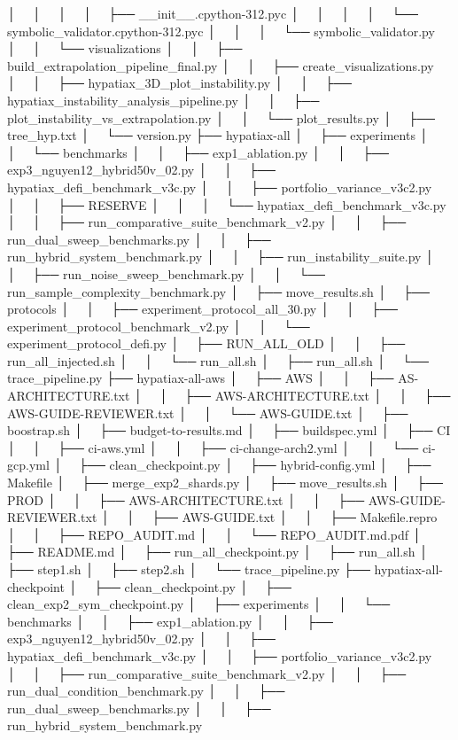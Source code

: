 │   │   │   │   ├── __init__.cpython-312.pyc
│   │   │   │   └── symbolic_validator.cpython-312.pyc
│   │   │   └── symbolic_validator.py
│   │   └── visualizations
│   │       ├── build_extrapolation_pipeline_final.py
│   │       ├── create_visualizations.py
│   │       ├── hypatiax_3D_plot_instability.py
│   │       ├── hypatiax_instability_analysis_pipeline.py
│   │       ├── plot_instability_vs_extrapolation.py
│   │       └── plot_results.py
│   ├── tree_hyp.txt
│   └── version.py
├── hypatiax-all
│   ├── experiments
│   │   └── benchmarks
│   │       ├── exp1_ablation.py
│   │       ├── exp3_nguyen12_hybrid50v_02.py
│   │       ├── hypatiax_defi_benchmark_v3c.py
│   │       ├── portfolio_variance_v3c2.py
│   │       ├── RESERVE
│   │       │   └── hypatiax_defi_benchmark_v3c.py
│   │       ├── run_comparative_suite_benchmark_v2.py
│   │       ├── run_dual_sweep_benchmarks.py
│   │       ├── run_hybrid_system_benchmark.py
│   │       ├── run_instability_suite.py
│   │       ├── run_noise_sweep_benchmark.py
│   │       └── run_sample_complexity_benchmark.py
│   ├── move_results.sh
│   ├── protocols
│   │   ├── experiment_protocol_all_30.py
│   │   ├── experiment_protocol_benchmark_v2.py
│   │   └── experiment_protocol_defi.py
│   ├── RUN_ALL_OLD
│   │   ├── run_all_injected.sh
│   │   └── run_all.sh
│   ├── run_all.sh
│   └── trace_pipeline.py
├── hypatiax-all-aws
│   ├── AWS
│   │   ├── AS-ARCHITECTURE.txt
│   │   ├── AWS-ARCHITECTURE.txt
│   │   ├── AWS-GUIDE-REVIEWER.txt
│   │   └── AWS-GUIDE.txt
│   ├── boostrap.sh
│   ├── budget-to-results.md
│   ├── buildspec.yml
│   ├── CI
│   │   ├── ci-aws.yml
│   │   ├── ci-change-arch2.yml
│   │   └── ci-gcp.yml
│   ├── clean_checkpoint.py
│   ├── hybrid-config.yml
│   ├── Makefile
│   ├── merge_exp2_shards.py
│   ├── move_results.sh
│   ├── PROD
│   │   ├── AWS-ARCHITECTURE.txt
│   │   ├── AWS-GUIDE-REVIEWER.txt
│   │   ├── AWS-GUIDE.txt
│   │   ├── Makefile.repro
│   │   ├── REPO_AUDIT.md
│   │   └── REPO_AUDIT.md.pdf
│   ├── README.md
│   ├── run_all_checkpoint.py
│   ├── run_all.sh
│   ├── step1.sh
│   ├── step2.sh
│   └── trace_pipeline.py
├── hypatiax-all-checkpoint
│   ├── clean_checkpoint.py
│   ├── clean_exp2_sym_checkpoint.py
│   ├── experiments
│   │   └── benchmarks
│   │       ├── exp1_ablation.py
│   │       ├── exp3_nguyen12_hybrid50v_02.py
│   │       ├── hypatiax_defi_benchmark_v3c.py
│   │       ├── portfolio_variance_v3c2.py
│   │       ├── run_comparative_suite_benchmark_v2.py
│   │       ├── run_dual_condition_benchmark.py
│   │       ├── run_dual_sweep_benchmarks.py
│   │       ├── run_hybrid_system_benchmark.py
